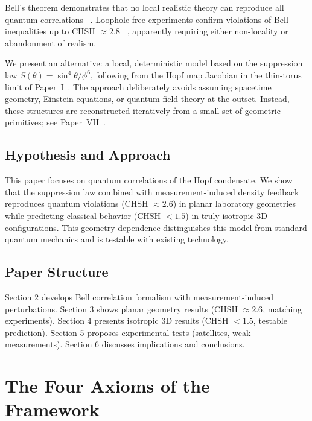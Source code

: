 \documentclass[11pt,a4paper]{article}
\theoremstyle{definition}
\theoremstyle{remark}
\begin{document}
Bell's theorem demonstrates that no local realistic theory can reproduce all quantum correlations ~\cite{Bell1964}. Loophole-free experiments confirm violations of Bell inequalities up to CHSH $\approx 2.8$ ~\cite{Hensen2015,Giustina2015,Shalm2015}, apparently requiring either non-locality or abandonment of realism.

We present an alternative: a local, deterministic model based on the suppression law $S(\theta) = \sin^4\theta/\phi^6$, following from the Hopf map Jacobian in the thin-torus limit of Paper~I~\cite{Paper1}. The approach deliberately avoids assuming spacetime geometry, Einstein equations, or quantum field theory at the outset. Instead, these structures are reconstructed iteratively from a small set of geometric primitives; see Paper~VII~\cite{Paper7}.

\subsection{Hypothesis and Approach}

This paper focuses on quantum correlations of the Hopf condensate. We show that the suppression law combined with measurement-induced density feedback reproduces quantum violations (CHSH $\approx 2.6$) in planar laboratory geometries while predicting classical behavior (CHSH $< 1.5$) in truly isotropic 3D configurations. This geometry dependence distinguishes this model from standard quantum mechanics and is testable with existing technology.

\subsection{Paper Structure}
Section 2 develops Bell correlation formalism with measurement-induced perturbations. Section 3 shows planar geometry results (CHSH $\approx 2.6$, matching experiments). Section 4 presents isotropic 3D results (CHSH $< 1.5$, testable prediction). Section 5 proposes experimental tests (satellites, weak measurements). Section 6 discusses implications and conclusions. 

\section{The Four Axioms of the Framework}
\label{P8:sec:axioms}
\end{document}
